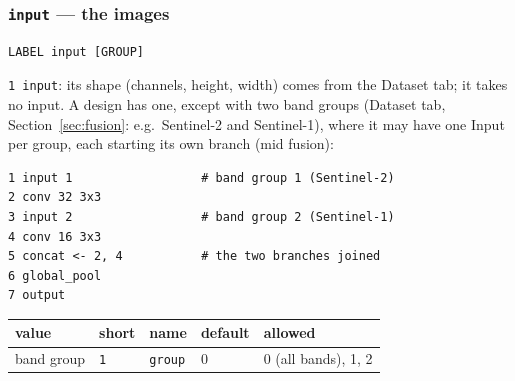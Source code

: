 \subsubsection*{\texttt{input} --- the images}
\begin{Verbatim}[fontsize=\small]
LABEL input [GROUP]
\end{Verbatim}
\texttt{1 input}: its shape (channels, height, width) comes from the Dataset tab; it takes no input. A design has one, except with two
band groups (Dataset tab, Section~\ref{sec:fusion}: e.g.\ Sentinel-2 and Sentinel-1), where it may have one Input per group, each
starting its own branch (mid fusion):
\begin{verbatim}
1 input 1                  # band group 1 (Sentinel-2)
2 conv 32 3x3
3 input 2                  # band group 2 (Sentinel-1)
4 conv 16 3x3
5 concat <- 2, 4           # the two branches joined
6 global_pool
7 output
\end{verbatim}
\begin{tabular}{@{}lllll@{}}
\toprule
value & short & name & default & allowed \\
\midrule
band group & \texttt{1} & \texttt{group} & 0 & 0 (all bands), 1, 2 \\
\bottomrule
\end{tabular}

